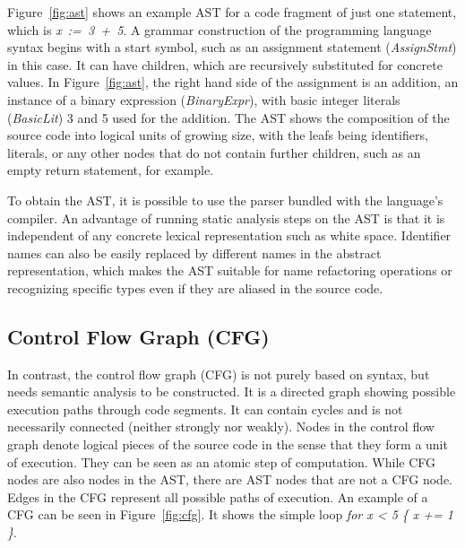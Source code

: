 

Figure~\ref{fig:ast} shows an example \acrshort{AST} for a code fragment of just one statement, which is
\textit{x~:=~3~+~5}.
A grammar construction of the programming language syntax begins with a start symbol, such as an assignment statement
(\textit{AssignStmt}) in this case.
It can have children, which are recursively substituted for concrete values.
In Figure~\ref{fig:ast}, the right hand side of the assignment is an addition, an instance of a binary expression
(\textit{BinaryExpr}), with basic integer literals (\textit{BasicLit}) 3 and 5 used for the addition.
The \acrshort{AST} shows the composition of the source code into logical units of growing size, with the leafs being
identifiers, literals, or any other nodes that do not contain further children, such as an empty return statement, for
example.

To obtain the \acrshort{AST}, it is possible to use the parser bundled with the language's compiler.
An advantage of running static analysis steps on the \acrshort{AST} is that it is independent of any concrete lexical
representation such as white space.
Identifier names can also be easily replaced by different names in the abstract representation, which makes the
\acrshort{AST} suitable for name refactoring operations or recognizing specific types even if they are aliased in the
source code.



\subsection{Control Flow Graph (CFG)}\label{subsec:background:static-code-analysis:cfg}

In contrast, the control flow graph (\acrshort{CFG}) is not purely based on syntax, but needs semantic analysis to be
constructed.
It is a directed graph showing possible execution paths through code segments.
It can contain cycles and is not necessarily connected (neither strongly nor weakly).
Nodes in the control flow graph denote logical pieces of the source code in the sense that they form a unit of
execution.
They can be seen as an atomic step of computation.
While \acrshort{CFG} nodes are also nodes in the \acrshort{AST}, there are \acrshort{AST} nodes that are not a
\acrshort{CFG} node.
Edges in the \acrshort{CFG} represent all possible paths of execution.
An example of a \acrshort{CFG} can be seen in Figure~\ref{fig:cfg}.
It shows the simple loop \textit{for x < 5 \{ x += 1 \}}.

